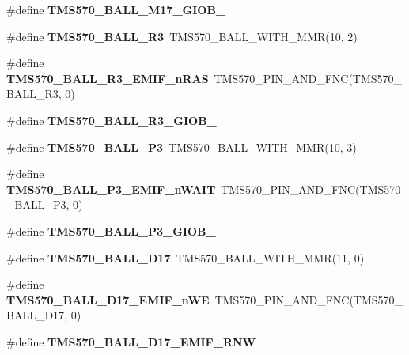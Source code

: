 \begin{DoxyCompactItemize}
\item 
\#define {\bfseries T\+M\+S570\+\_\+\+B\+A\+L\+L\+\_\+\+M17\+\_\+\+G\+I\+O\+B\+\_}
\item 
\mbox{\label{tms570lc4357-pins_8h_a49a9d5474ca8b37035ac0a9d0aedb99c}} 
\#define {\bfseries T\+M\+S570\+\_\+\+B\+A\+L\+L\+\_\+\+R3}~T\+M\+S570\+\_\+\+B\+A\+L\+L\+\_\+\+W\+I\+T\+H\+\_\+\+M\+MR(10, 2)
\item 
\mbox{\label{tms570lc4357-pins_8h_a83e555827f8287bb08d1bc6595d293dd}} 
\#define {\bfseries T\+M\+S570\+\_\+\+B\+A\+L\+L\+\_\+\+R3\+\_\+\+E\+M\+I\+F\+\_\+n\+R\+AS}~T\+M\+S570\+\_\+\+P\+I\+N\+\_\+\+A\+N\+D\+\_\+\+F\+NC(T\+M\+S570\+\_\+\+B\+A\+L\+L\+\_\+\+R3, 0)
\item 
\#define {\bfseries T\+M\+S570\+\_\+\+B\+A\+L\+L\+\_\+\+R3\+\_\+\+G\+I\+O\+B\+\_}
\item 
\mbox{\label{tms570lc4357-pins_8h_ab5d83d59ec0737a987c1987f8139009a}} 
\#define {\bfseries T\+M\+S570\+\_\+\+B\+A\+L\+L\+\_\+\+P3}~T\+M\+S570\+\_\+\+B\+A\+L\+L\+\_\+\+W\+I\+T\+H\+\_\+\+M\+MR(10, 3)
\item 
\mbox{\label{tms570lc4357-pins_8h_a14f3489df8fa25715795c263d8dca4b8}} 
\#define {\bfseries T\+M\+S570\+\_\+\+B\+A\+L\+L\+\_\+\+P3\+\_\+\+E\+M\+I\+F\+\_\+n\+W\+A\+IT}~T\+M\+S570\+\_\+\+P\+I\+N\+\_\+\+A\+N\+D\+\_\+\+F\+NC(T\+M\+S570\+\_\+\+B\+A\+L\+L\+\_\+\+P3, 0)
\item 
\#define {\bfseries T\+M\+S570\+\_\+\+B\+A\+L\+L\+\_\+\+P3\+\_\+\+G\+I\+O\+B\+\_}
\item 
\mbox{\label{tms570lc4357-pins_8h_aea31f5590030120579731c866e51f5cd}} 
\#define {\bfseries T\+M\+S570\+\_\+\+B\+A\+L\+L\+\_\+\+D17}~T\+M\+S570\+\_\+\+B\+A\+L\+L\+\_\+\+W\+I\+T\+H\+\_\+\+M\+MR(11, 0)
\item 
\mbox{\label{tms570lc4357-pins_8h_adc9d024fb3f0fee431a2fca7c95f1374}} 
\#define {\bfseries T\+M\+S570\+\_\+\+B\+A\+L\+L\+\_\+\+D17\+\_\+\+E\+M\+I\+F\+\_\+n\+WE}~T\+M\+S570\+\_\+\+P\+I\+N\+\_\+\+A\+N\+D\+\_\+\+F\+NC(T\+M\+S570\+\_\+\+B\+A\+L\+L\+\_\+\+D17, 0)
\item 
\#define {\bfseries T\+M\+S570\+\_\+\+B\+A\+L\+L\+\_\+\+D17\+\_\+\+E\+M\+I\+F\+\_\+\+R\+NW}

\end{DoxyCompactItemize}
